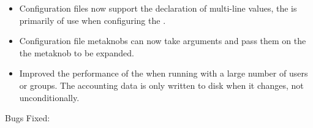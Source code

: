 \begin{itemize}
\item Configuration files now support the declaration of multi-line values, the is primarily of use when
configuring the .

\item Configuration file metaknobs can now take arguments and pass them
on the the metaknob to be expanded.

\item Improved the performance of the  when running
with a large number of users or groups.  The accounting data is only
written to disk when it changes, not unconditionally.

\end{itemize}

\noindent Bugs Fixed:

